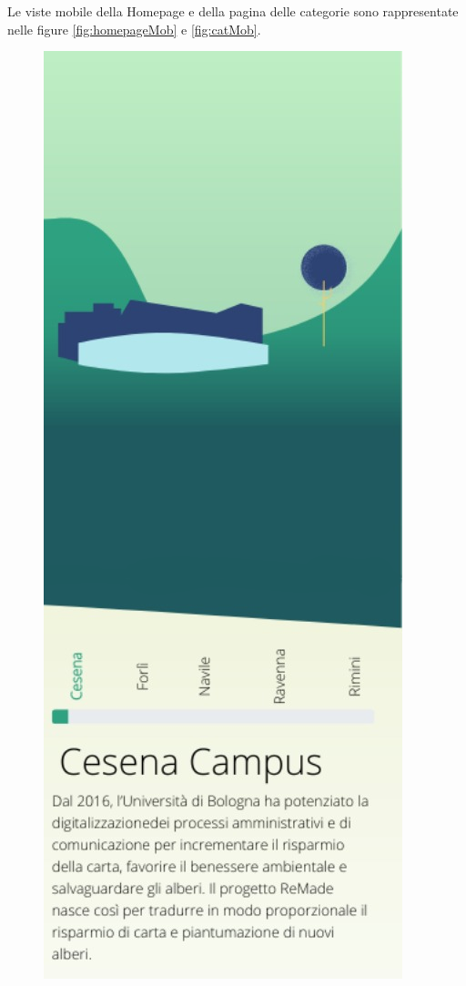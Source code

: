 \noindent Le viste mobile della Homepage e della pagina delle categorie sono rappresentate nelle figure \ref{fig:homepageMob} e \ref{fig:catMob}.


\begin{figure}[H]
\centering
\begin{minipage}{.5\textwidth}
  \centering
  \includegraphics[width=.9\linewidth]{img/homepageMobile.png}

\end{minipage}
\end{figure}

